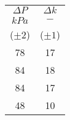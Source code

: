 \begin{table}[H]
    \centering
    \begin{tabular}{|c|c|}
    \hline
        $\Delta P$	&	$\Delta k$	\\
        $kPa$	&	$-$	\\
        ($\pm2$)	&	($\pm 1$)	\\
        \hline
        78	&	17	\\
        84	&	18	\\
        84	&	17	\\
        48	&	10	\\
    \hline
    \end{tabular}
\end{table}